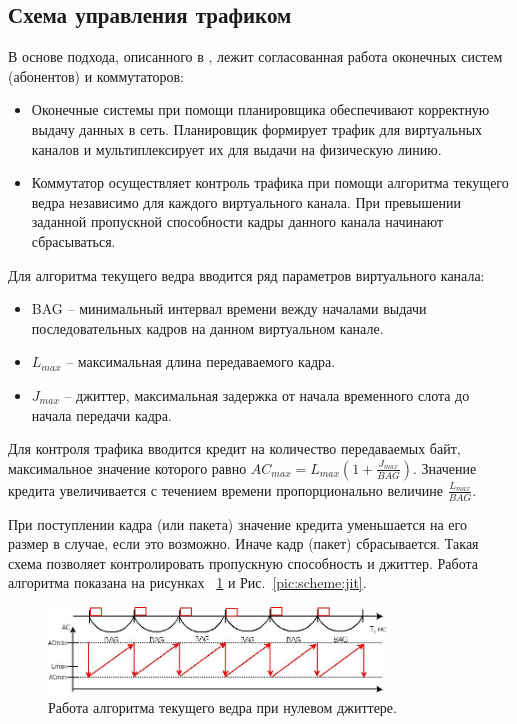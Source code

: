 \documentclass[12pt, a4paper]{article}
\begin{document}
\subsection{Схема управления трафиком}
В основе подхода, описанного в \cite{vdovin}, лежит согласованная работа оконечных систем (абонентов) и коммутаторов:
\begin{itemize}
	\item Оконечные системы при помощи планировщика обеспечивают корректную выдачу данных в сеть. Планировщик формирует трафик для виртуальных каналов и мультиплексирует их для выдачи на физическую линию.
	\item Коммутатор осуществляет контроль трафика при помощи алгоритма текущего ведра независимо для каждого виртуального канала. При превышении заданной пропускной способности кадры данного канала начинают сбрасываться.
\end{itemize}


Для алгоритма текущего ведра вводится ряд параметров виртуального канала:
\begin{itemize}
	\item BAG -- минимальный интервал времени вежду началами выдачи последовательных кадров на данном виртуальном канале.
	\item $L_{max}$ -- максимальная длина передаваемого кадра.
	\item $J_{max}$ -- джиттер, максимальная задержка от начала временного слота до начала передачи кадра.
\end{itemize}

Для контроля трафика вводится кредит на количество передаваемых байт, максимальное значение которого равно $AC_{max} = L_{max}(1 + \frac{J_{max}}{BAG})$. Значение
кредита увеличивается с течением времени пропорционально величине $\frac{L_{max}}{BAG}$.

При поступлении кадра (или пакета) значение кредита уменьшается на его размер в случае, если это возможно. Иначе кадр (пакет) сбрасывается. Такая схема позволяет контролировать пропускную способность и джиттер. Работа алгоритма показана на рисунках ~\ref{pic:scheme:nojit} и Рис.~\ref{pic:scheme:jit}.

\begin{figure}[h!]
	\centering
	\includegraphics[width=0.80\textwidth]{img/nojit.png}
	\caption[russian]{Работа алгоритма текущего ведра при нулевом джиттере.}
	\label{pic:scheme:nojit}
\end{figure}
\end{document}
